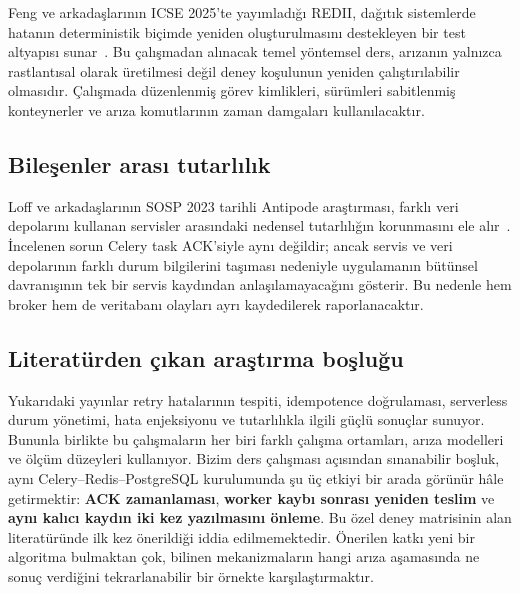 \documentclass[conference,a4paper]{IEEEtran}
\begin{document}
Feng ve arkadaşlarının ICSE 2025'te yayımladığı REDII, dağıtık sistemlerde hatanın deterministik biçimde yeniden oluşturulmasını destekleyen bir test altyapısı sunar~\cite{feng2025}. Bu çalışmadan alınacak temel yöntemsel ders, arızanın yalnızca rastlantısal olarak üretilmesi değil deney koşulunun yeniden çalıştırılabilir olmasıdır. Çalışmada düzenlenmiş görev kimlikleri, sürümleri sabitlenmiş konteynerler ve arıza komutlarının zaman damgaları kullanılacaktır.

\subsection{Bileşenler arası tutarlılık}
Loff ve arkadaşlarının SOSP 2023 tarihli Antipode araştırması, farklı veri depolarını kullanan servisler arasındaki nedensel tutarlılığın korunmasını ele alır~\cite{loff2023}. İncelenen sorun Celery task ACK'siyle aynı değildir; ancak servis ve veri depolarının farklı durum bilgilerini taşıması nedeniyle uygulamanın bütünsel davranışının tek bir servis kaydından anlaşılamayacağını gösterir. Bu nedenle hem broker hem de veritabanı olayları ayrı kaydedilerek raporlanacaktır.

\subsection{Literatürden çıkan araştırma boşluğu}
Yukarıdaki yayınlar retry hatalarının tespiti, idempotence doğrulaması, serverless durum yönetimi, hata enjeksiyonu ve tutarlılıkla ilgili güçlü sonuçlar sunuyor. Bununla birlikte bu çalışmaların her biri farklı çalışma ortamları, arıza modelleri ve ölçüm düzeyleri kullanıyor. Bizim ders çalışması açısından sınanabilir boşluk, aynı Celery--Redis--PostgreSQL kurulumunda şu üç etkiyi bir arada görünür hâle getirmektir: \textbf{ACK zamanlaması}, \textbf{worker kaybı sonrası yeniden teslim} ve \textbf{aynı kalıcı kaydın iki kez yazılmasını önleme}. Bu özel deney matrisinin alan literatüründe ilk kez önerildiği iddia edilmemektedir. Önerilen katkı yeni bir algoritma bulmaktan çok, bilinen mekanizmaların hangi arıza aşamasında ne sonuç verdiğini tekrarlanabilir bir örnekte karşılaştırmaktır.
\end{document}
